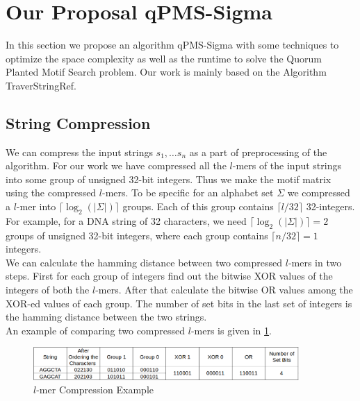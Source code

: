{%


\section{Our Proposal qPMS-Sigma}
In this section we propose an algorithm qPMS-Sigma with some techniques to optimize the space complexity as well as the runtime to solve the Quorum Planted Motif Search problem. Our work is mainly based on the Algorithm TraverStringRef. 

\subsection{String Compression}
We can compress the input strings $s_1,\dots s_n$ as a part of preprocessing of the algorithm. For our work we have compressed all the $l$-mers of the input strings into some group of unsigned 32-bit integers. Thus we make the motif matrix using the compressed $l$-mers. To be specific for an alphabet set $\Sigma$ we compressed a $l$-mer into $\lceil \log_{2}(\lvert \Sigma \rvert)\rceil$ groups. Each of this group contains $\lceil l/32\rceil$ 32-integers. \\

For example, for a DNA string of 32 characters, we need $\lceil \log_{2}(\lvert \Sigma \rvert)\rceil=2$ groups of unsigned 32-bit integers,  where each group contains $\lceil n/32\rceil = 1$ integers.\\

We can calculate the hamming distance between two compressed $l$-mers in two steps. First for each group of integers find out the bitwise XOR values of the integers of both the $l$-mers. After that calculate the bitwise OR values among the XOR-ed values of each group. The number of set bits in the last set of integers is the hamming distance between the two strings.\\

An example of comparing two compressed $l$-mers is given in \cref{strexample}.

\begin{figure}[H]
	\centering
	\includegraphics[width=0.9\textwidth]{figures/example.png}
	\caption{$l$-mer Compression Example}
	\label{strexample}
\end{figure}

}
